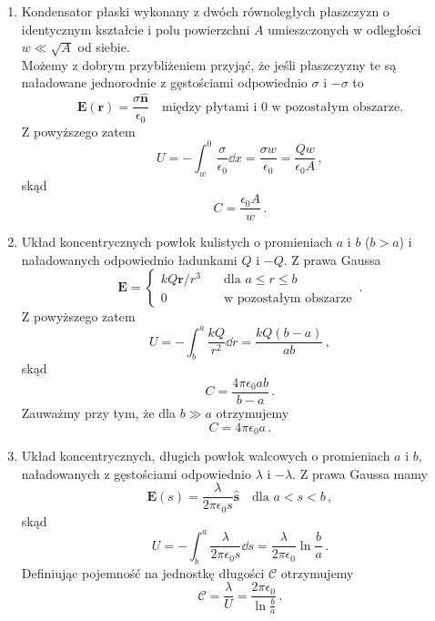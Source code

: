 \documentclass[../main.tex]{subfiles}
\begin{document}
\begin{enumerate}
    \item Kondensator płaski wykonany z dwóch równoległych płaszczyzn o identycznym kształcie i polu powierzchni \(A\) umieszczonych w odległości \(w\ll\sqrt{A}\) od siebie.\\
    Możemy z dobrym przybliżeniem przyjąć, że jeśli płaszczyzny te są naładowane jednorodnie z gęstościami odpowiednio \(\sigma\) i \(-\sigma\) to
    \begin{equation*}
        \mathbf{E}(\mathbf{r})=\frac{\sigma \mathbf{\hat{n}}}{\epsilon_0}\quad\text{między płytami i 0 w pozostałym obszarze.}
    \end{equation*}
    Z powyższego zatem
    \begin{equation*}
        U=-\int_w^0\frac{\sigma }{\epsilon_0}\dd{x}=\frac{\sigma w}{\epsilon_0}=\frac{Qw}{\epsilon_0A}\,,
    \end{equation*}
    skąd
    \begin{equation*}
        C=\frac{\epsilon_0 A}{w}\,.
    \end{equation*}
    \item Układ koncentrycznych powłok kulistych o promieniach \(a\) i \(b\) (\(b>a\)) i naładowanych odpowiednio ładunkami \(Q\) i \(-Q\). Z prawa Gaussa
    \begin{equation*}
        \mathbf{E}=\begin{cases}
        kQ\mathbf{r}/r^3\quad&\text{dla \(a\leq r\leq b\)}\\
        0\quad&\text{w pozostałym obszarze}
        \end{cases}\,.
    \end{equation*}
    Z powyższego zatem
    \begin{equation*}
        U=-\int_b^a\frac{kQ}{r^2}\dd{r}=\frac{kQ(b-a)}{ab}\,,
    \end{equation*}
    skąd
    \begin{equation*}
        C=\frac{4\pi\epsilon_0ab}{b-a}\,.
    \end{equation*}
    Zauważmy przy tym, że dla \(b\gg a\) otrzymujemy
    \begin{equation*}
        C=4\pi\epsilon_0a\,.
    \end{equation*}
    \item Układ koncentrycznych, długich powłok walcowych o promieniach \(a\) i \(b\), naładowanych z gęstościami odpowiednio \(\lambda\) i \(-\lambda\). Z prawa Gaussa mamy
    \begin{equation*}
        \mathbf{E}(s)=\frac{\lambda}{2\pi\epsilon_0 s}\mathbf{\hat{s}}\quad\text{dla \(a<s<b\)}\,,
    \end{equation*}
    skąd
    \begin{equation*}
        U=-\int_b^a\frac{\lambda}{2\pi\epsilon_0s}\dd{s}=\frac{\lambda}{2\pi\epsilon_0}\ln\frac{b}{a}\,.
    \end{equation*}
    Definiując pojemność na jednostkę długości \(\mathcal{C}\) otrzymujemy
    \begin{equation*}
        \mathcal{C}=\frac{\lambda}{U}=\frac{2\pi\epsilon_0}{\ln\frac{b}{a}}\,.
    \end{equation*}
\end{enumerate}
\end{document}

